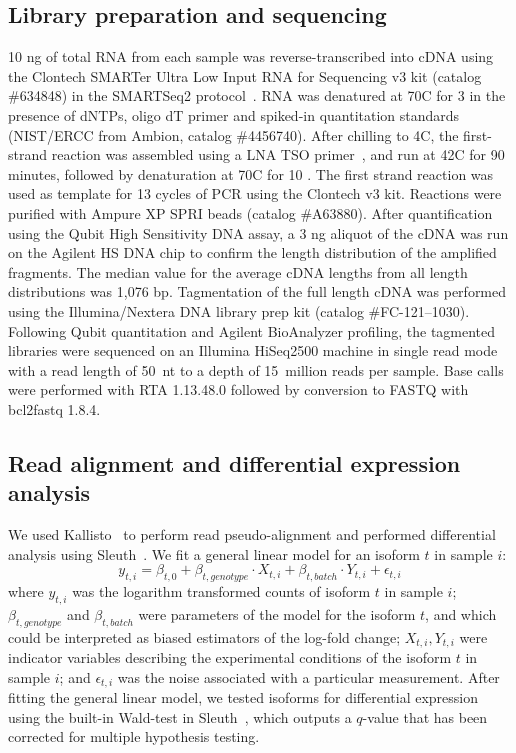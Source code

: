 \documentclass[9pt,twocolumn,twoside]{pnas-new}
\begin{document}
{\subsection*{Library preparation and sequencing}
10 \si{\nano\gram} of total RNA from each sample was
reverse-transcribed into cDNA using the Clontech SMARTer Ultra Low Input RNA for
Sequencing v3 kit (catalog \#634848) in the SMARTSeq2
protocol~\cite{Picelli2014}.  RNA was denatured at 70\degree{}C for 3 \si{\min}
in the presence of dNTPs, oligo dT primer and spiked-in quantitation standards
(NIST/ERCC from Ambion, catalog \#4456740). After chilling to 4\degree{}C, the
first-strand reaction was assembled using a LNA TSO primer~\cite{Picelli2014},
and run at 42\degree{}C for 90 minutes, followed by denaturation at
70\degree{}C for 10 \si{\min}.  The first
strand reaction was used as template for 13 cycles of PCR using the
Clontech v3 kit. Reactions were purified with Ampure XP SPRI
beads (catalog \#A63880).  After
quantification using the Qubit High Sensitivity DNA assay, a 3 \si{\nano\gram}
aliquot of the cDNA was run on the Agilent HS DNA chip to confirm the
length distribution of the amplified fragments. The median value for the
average cDNA lengths from all length distributions was 1,076 bp.  Tagmentation
of the full length cDNA was performed using the Illumina/Nextera
DNA library prep kit (catalog \#FC-121--1030). Following Qubit quantitation and
Agilent BioAnalyzer profiling, the tagmented libraries were sequenced on
an Illumina HiSeq2500 machine in single read mode with a read length of
50~nt to a depth of 15~million reads per sample. Base calls were performed with
RTA 1.13.48.0 followed by conversion to FASTQ with bcl2fastq 1.8.4.

\subsection*{Read alignment and differential expression analysis}
We used Kallisto~\cite{Bray2016} to perform read pseudo-alignment and performed
differential analysis using Sleuth~\cite{Pimentel2016}. We fit a general linear
model for an isoform $t$ in sample $i$:
\begin{equation}
  y_{t,i} = \beta_{t, 0} + \beta_{t, genotype}\cdot{}X_{t, i} +
  \beta_{t, batch}\cdot{}Y_{t, i} + \epsilon_{t, i}
\end{equation}
where $y_{t, i}$ was the logarithm transformed counts of isoform $t$ in sample
$i$; $\beta_{t, genotype}$ and $\beta_{t, batch}$ were parameters of the model
for the isoform $t$, and which could be interpreted as biased estimators of the
log-fold change; $X_{t, i}, Y_{t, i}$ were indicator variables describing the
experimental conditions of the isoform $t$ in sample $i$; and $\epsilon_{t, i}$
was the noise associated with a particular measurement.
After fitting the
general linear model, we tested isoforms for differential expression using the
built-in Wald-test in Sleuth~\cite{Pimentel2016}, which outputs a $q$-value that
has been corrected for multiple hypothesis testing.
\color{black}

}
\end{document}
